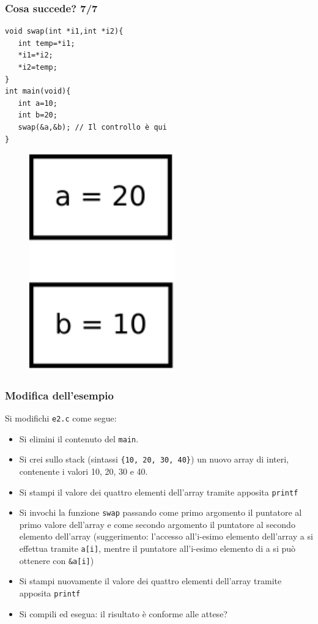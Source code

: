 \documentclass{beamer}
\begin{document}
\begin{frame}[fragile]
\frametitle{Cosa succede? 7/7}
\begin{verbatim}
void swap(int *i1,int *i2){
   int temp=*i1;
   *i1=*i2;
   *i2=temp;
}    
int main(void){
   int a=10;
   int b=20;
   swap(&a,&b); // Il controllo è qui
}\end{verbatim}
\begin{figure}
 \includegraphics[width = 0.2\columnwidth]{img/7}
\end{figure}
\end{frame}

\begin{frame}
\frametitle{Modifica dell'esempio}
Si modifichi \texttt{e2.c} come segue:
\begin{itemize}
 \item Si elimini il contenuto del \texttt{main}.
 \item Si crei sullo stack (sintassi \texttt{\{10, 20, 30, 40\}}) un nuovo array di interi, contenente i valori 10, 20, 30 e 40.
 \item Si stampi il valore dei quattro elementi dell'array tramite apposita \texttt{printf}
 \item Si invochi la funzione \texttt{swap} passando come primo argomento il puntatore al primo valore dell'array e come secondo argomento il puntatore al secondo elemento dell'array (suggerimento: l'accesso all'i-esimo elemento dell'array a si effettua tramite \texttt{a[i]}, mentre il puntatore all'i-esimo elemento di a si può ottenere con \texttt{\&a[i]})
 \item Si stampi nuovamente il valore dei quattro elementi dell'array tramite apposita \texttt{printf}
 \item Si compili ed esegua: il risultato è conforme alle attese?
\end{itemize}
\end{frame}
\end{document}
